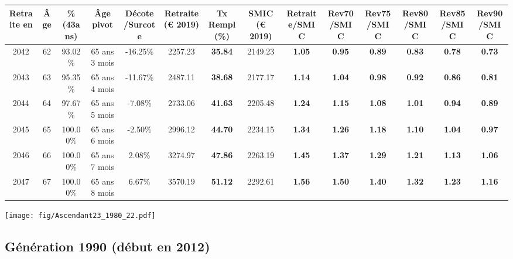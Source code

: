 \begin{adjustbox}{max width=\textwidth} 
\begin{tabular}[htb]{|c|c||c|c|c||c|c||c||c|c|c|c|c|c|} 
\hline 
 Retraite en &  Âge &  \%(43ans) &  Âge pivot &  Décote/Surcote &  Retraite (\euro{} 2019) &  Tx Rempl(\%) &  SMIC (\euro{} 2019) &  Retraite/SMIC &  Rev70/SMIC &  Rev75/SMIC &  Rev80/SMIC &  Rev85/SMIC &  Rev90/SMIC \\ 
\hline \hline 
 2042 &  62 &  93.02\% &  65 ans 3 mois &  -16.25\% &  2257.23 &  {\bf 35.84} &  2149.23 &  {\bf 1.05} &  {\bf {\color{red} 0.95}} &  {\bf {\color{red} 0.89}} &  {\bf {\color{red} 0.83}} &  {\bf {\color{red} 0.78}} &  {\bf {\color{red} 0.73}} \\ 
\hline 
 2043 &  63 &  95.35\% &  65 ans 4 mois &  -11.67\% &  2487.11 &  {\bf 38.68} &  2177.17 &  {\bf 1.14} &  {\bf 1.04} &  {\bf {\color{red} 0.98}} &  {\bf {\color{red} 0.92}} &  {\bf {\color{red} 0.86}} &  {\bf {\color{red} 0.81}} \\ 
\hline 
 2044 &  64 &  97.67\% &  65 ans 5 mois &  -7.08\% &  2733.06 &  {\bf 41.63} &  2205.48 &  {\bf 1.24} &  {\bf 1.15} &  {\bf 1.08} &  {\bf 1.01} &  {\bf {\color{red} 0.94}} &  {\bf {\color{red} 0.89}} \\ 
\hline 
 2045 &  65 &  100.00\% &  65 ans 6 mois &  -2.50\% &  2996.12 &  {\bf 44.70} &  2234.15 &  {\bf 1.34} &  {\bf 1.26} &  {\bf 1.18} &  {\bf 1.10} &  {\bf 1.04} &  {\bf {\color{red} 0.97}} \\ 
\hline 
 2046 &  66 &  100.00\% &  65 ans 7 mois &  2.08\% &  3274.97 &  {\bf 47.86} &  2263.19 &  {\bf 1.45} &  {\bf 1.37} &  {\bf 1.29} &  {\bf 1.21} &  {\bf 1.13} &  {\bf 1.06} \\ 
\hline 
 2047 &  67 &  100.00\% &  65 ans 8 mois &  6.67\% &  3570.19 &  {\bf 51.12} &  2292.61 &  {\bf 1.56} &  {\bf 1.50} &  {\bf 1.40} &  {\bf 1.32} &  {\bf 1.23} &  {\bf 1.16} \\ 
\hline 
\hline 
\end{tabular} 
\end{adjustbox} 
 
 \vspace{0.1cm} 

 \begin{center}\texttt{[image: fig/Ascendant23\_1980\_22.pdf]}\end{center} \label{fig/Ascendant23_1980_22.pdf} 

\newpage 
 
\subsection{Génération 1990 (début en 2012)} 

